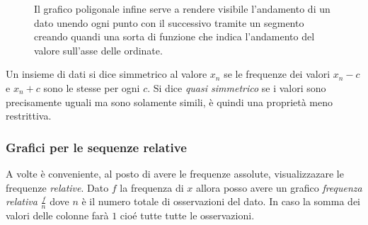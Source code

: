 \documentclass{article}
\begin{document}
    \begin{figure}[h]
      \begin{minipage}{0.35\textwidth} %
      \end{minipage}
      \hfill
      \begin{minipage}{0.6\textwidth} %
        Il grafico poligonale infine serve a rendere visibile l'andamento di un dato unendo ogni punto con il successivo tramite un segmento creando quandi una sorta di funzione che indica l'andamento del valore sull'asse delle ordinate.    
      \end{minipage}
    \end{figure}
  
  Un insieme di dati si dice simmetrico al valore $x_n$ se le frequenze dei valori $x_n-c$ e $x_n+c$ sono le stesse per ogni $c$. Si dice \textit{quasi simmetrico} se i valori sono precisamente uguali ma sono solamente simili, è quindi una proprietà meno restrittiva.
  
  \subsubsection*{Grafici per le sequenze relative}
  
  A volte è conveniente, al posto di avere le frequenze assolute, visualizzazare le frequenze \textit{relative}. Dato $f$ la frequenza di $x$ allora posso avere un grafico \textit{frequenza relativa} $\frac{f}{n}$ dove $n$ è il numero totale di osservazioni del dato. In caso la somma dei valori delle colonne farà $1$ cioé tutte tutte le osservazioni.
  
\end{document}
